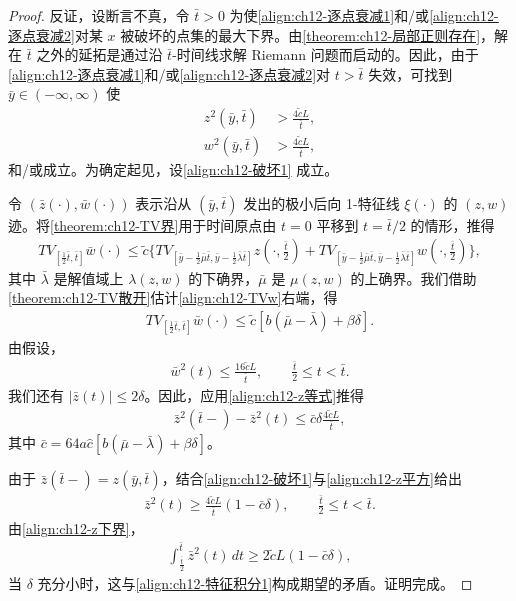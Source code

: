 \documentclass[../../main.tex]{subfiles}
\begin{document}
\begin{proof}
反证，设断言不真，令 $\bar t>0$ 为使\eqref{align:ch12-逐点衰减1}和/或\eqref{align:ch12-逐点衰减2}对某 $x$ 被破坏的点集的最大下界。由\cref{theorem:ch12-局部正则存在}，解在 $\bar t$ 之外的延拓是通过沿 $\bar t$-时间线求解 Riemann 问题而启动的。因此，由于\eqref{align:ch12-逐点衰减1}和/或\eqref{align:ch12-逐点衰减2}对 $t>\bar t$ 失效，可找到 $\bar y\in(-\infty,\infty)$ 使
\begin{align}
z^2(\bar y,\bar t)&>\frac{4\tilde c L}{\bar t},
\label{align:ch12-破坏1}\\
w^2(\bar y,\bar t)&>\frac{4\tilde c L}{\bar t},
\label{align:ch12-破坏2}
\end{align}
和/或成立。为确定起见，设\eqref{align:ch12-破坏1} 成立。

令 $(\bar z(\cdot),\bar w(\cdot))$ 表示沿从 $(\bar y,\bar t)$ 发出的极小后向 1-特征线 $\xi(\cdot)$ 的 $(z,w)$ 迹。将\cref{theorem:ch12-TV界}用于时间原点由 $t=0$ 平移到 $t=\bar t/2$ 的情形，推得
\begin{align}
TV_{[\frac12\bar t,\bar t]}\bar w(\cdot)\leqslant\tilde c\{TV_{[\bar y-\frac12\bar\mu\bar t,\bar y-\frac12\bar\lambda\bar t]}z\left(\cdot,\frac{\bar t}{2}\right)+TV_{[\bar y-\frac12\bar\mu\bar t,\bar y-\frac12\bar\lambda\bar t]}w\left(\cdot,\frac{\bar t}{2}\right)\},
\label{align:ch12-TVw}
\end{align}
其中 $\bar\lambda$ 是解值域上 $\lambda(z,w)$ 的下确界，$\bar\mu$ 是 $\mu(z,w)$ 的上确界。我们借助\cref{theorem:ch12-TV散开}估计\eqref{align:ch12-TVw}右端，得
\begin{align}
TV_{[\frac12\bar t,\bar t]}\bar w(\cdot)\leqslant\tilde c[b(\bar\mu-\bar\lambda)+\beta\delta].
\label{align:ch12-TVw估计}
\end{align}
由假设，
\begin{align}
\bar w^2(t)\leqslant\frac{16\tilde c L}{\bar t},\qquad \frac{\bar t}{2}\leqslant t<\bar t.
\label{align:ch12-w界-s08}
\end{align}
我们还有 $|\bar z(t)|\leqslant 2\delta$。因此，应用\eqref{align:ch12-z等式}推得
\begin{align}
\bar z^2(\bar t-)-\bar z^2(t)\leqslant\bar c\delta\frac{4\tilde c L}{\bar t},
\label{align:ch12-z平方}
\end{align}
其中 $\bar c=64a\hat c[b(\bar\mu-\bar\lambda)+\beta\delta]$。

由于 $\bar z(\bar t-)=z(\bar y,\bar t)$，结合\eqref{align:ch12-破坏1}与\eqref{align:ch12-z平方}给出
\begin{align}
\bar z^2(t)\geqslant\frac{4\tilde c L}{\bar t}(1-\bar c\delta),\qquad \frac{\bar t}{2}\leqslant t<\bar t.
\label{align:ch12-z下界}
\end{align}
由\eqref{align:ch12-z下界}，
\begin{align}
\int_{\frac{\bar t}{2}}^{\bar t}\bar z^2(t)\,dt\geqslant 2\tilde c L(1-\bar c\delta),
\label{align:ch12-z积分}
\end{align}
当 $\delta$ 充分小时，这与\eqref{align:ch12-特征积分1}构成期望的矛盾。证明完成。
\end{proof}
\end{document}
